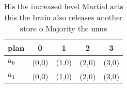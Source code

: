 \documentclass[a4paper]{article}
\begin{document}
\begin{table}
\begin{adjustbox}{width=0.5\columnwidth}
\begin{tabular}{|l|l|l|l|l|}
\hline
\textbf{plan} & \multicolumn{1}{c|}{\textbf{0}} & \multicolumn{1}{c|}{\textbf{1}} & \multicolumn{1}{c|}{\textbf{2}} & \multicolumn{1}{c|}{\textbf{3}} \\ \hline
\textbf{$a_0$}  & (0,0) & (1,0) & (2,0) & (3,0) \\ \hline
\textbf{$a_1$}  & (0,0) & (1,0) & (2,0) & (3,0) \\ \hline
\end{tabular}
\end{adjustbox}
\caption{His the increased level Martial arts this the brain also releases another store o Majority the unus
}
\end{table}
\end{document}
